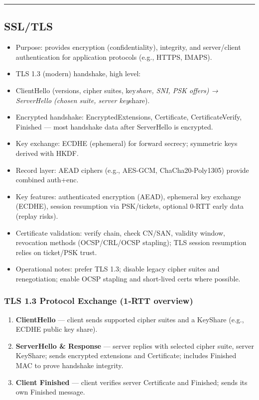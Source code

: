\documentclass{article}
\begin{document}
\hrule

\subsection{SSL/TLS}
\begin{itemize}
  \item Purpose: provides encryption (confidentiality), integrity, and server/client authentication for application protocols (e.g., HTTPS, IMAPS).
  \item TLS 1.3 (modern) handshake, high level:
  \item ClientHello (versions, cipher suites, key\textit{share, SNI, PSK offers) → ServerHello (chosen suite, server key}share).
  \item Encrypted handshake: EncryptedExtensions, Certificate, CertificateVerify, Finished — most handshake data after ServerHello is encrypted.
  \item Key exchange: ECDHE (ephemeral) for forward secrecy; symmetric keys derived with HKDF.
  \item Record layer: AEAD ciphers (e.g., AES-GCM, ChaCha20-Poly1305) provide combined auth+enc.
  \item Key features: authenticated encryption (AEAD), ephemeral key exchange (ECDHE), session resumption via PSK/tickets, optional 0-RTT early data (replay risks).
  \item Certificate validation: verify chain, check CN/SAN, validity window, revocation methods (OCSP/CRL/OCSP stapling); TLS session resumption relies on ticket/PSK trust.
  \item Operational notes: prefer TLS 1.3; disable legacy cipher suites and renegotiation; enable OCSP stapling and short-lived certs where possible.
\end{itemize}

\subsubsection{TLS 1.3 Protocol Exchange (1‑RTT overview)}
\begin{enumerate}
  \item \textbf{ClientHello} — client sends supported cipher suites and a KeyShare (e.g., ECDHE public key share).
  \item \textbf{ServerHello \& Response} — server replies with selected cipher suite, server KeyShare; sends encrypted extensions and Certificate; includes Finished MAC to prove handshake integrity.
  \item \textbf{Client Finished} — client verifies server Certificate and Finished; sends its own Finished message.
\end{enumerate}
\end{document}
